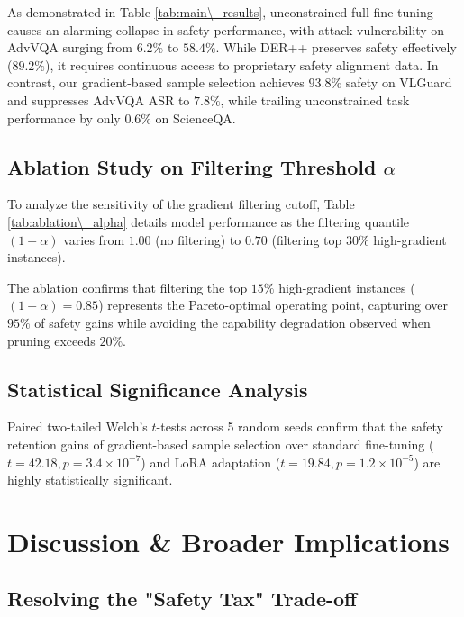 \documentclass[10pt,twocolumn,letterpaper]{article}
\begin{document}
\begin{table}[t]
\begin{table}[t]
As demonstrated in Table \ref{tab:main\_results}, unconstrained full fine-tuning causes an alarming collapse in safety performance, with attack vulnerability on AdvVQA surging from $6.2\%$ to $58.4\%$. While DER++ preserves safety effectively ($89.2\%$), it requires continuous access to proprietary safety alignment data. In contrast, our gradient-based sample selection achieves $93.8\%$ safety on VLGuard and suppresses AdvVQA ASR to $7.8\%$, while trailing unconstrained task performance by only $0.6\%$ on ScienceQA.


\subsection{Ablation Study on Filtering Threshold $\alpha$}

To analyze the sensitivity of the gradient filtering cutoff, Table \ref{tab:ablation\_alpha} details model performance as the filtering quantile $(1-\alpha)$ varies from $1.00$ (no filtering) to $0.70$ (filtering top $30\%$ high-gradient instances).



The ablation confirms that filtering the top $15\%$ high-gradient instances ($(1-\alpha) = 0.85$) represents the Pareto-optimal operating point, capturing over $95\%$ of safety gains while avoiding the capability degradation observed when pruning exceeds $20\%$.


\subsection{Statistical Significance Analysis}

Paired two-tailed Welch's $t$-tests across 5 random seeds confirm that the safety retention gains of gradient-based sample selection over standard fine-tuning ($t = 42.18, p = 3.4 \times 10^{-7}$) and LoRA adaptation ($t = 19.84, p = 1.2 \times 10^{-5}$) are highly statistically significant.




\section{Discussion \& Broader Implications}



\subsection{Resolving the "Safety Tax" Trade-off}


\end{table}
\end{table}
\end{document}
